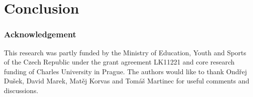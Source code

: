 \chapter{Conclusion}
\label{cha:conclusion}


\subsection*{Acknowledgement}
\label{sub:acknowledgement}
This research was partly funded by the Ministry of Education, Youth and Sports
of the Czech Republic under the grant agreement LK11221 and core research
funding of Charles University in Prague. The authors would like to thank
Ond\v{r}ej Du\v{s}ek, David Marek, Mat\v{e}j Korvas and Tom\'{a}\v{s} Martinec for useful comments and
discussions.  

